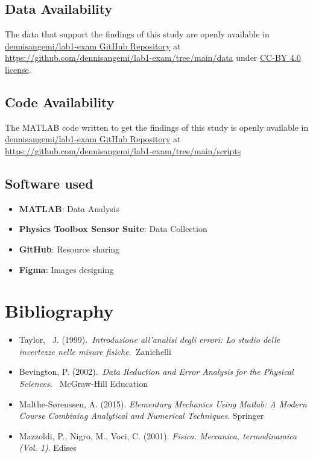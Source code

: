 \documentclass[11pt,a4paper]{article}
\begin{document}
\subsection{Data Availability}
The data that support the findings of this study are openly available in \href{https://github.com/dennisangemi/lab1-exam/tree/main/data}{dennisangemi/lab1-exam GitHub Repository} at \href{https://github.com/dennisangemi/lab1-exam}{https://github.com/dennisangemi/lab1-exam/tree/main/data} under \href{https://creativecommons.org/licenses/by/4.0/}{CC-BY 4.0 license}.

\subsection{Code Availability}
The MATLAB code written to get the findings of this study is openly available in \href{https://github.com/dennisangemi/lab1-exam/tree/main/scripts}{dennisangemi/lab1-exam GitHub Repository} at \href{https://github.com/dennisangemi/lab1-exam/tree/main/scripts}{https://github.com/dennisangemi/lab1-exam/tree/main/scripts}


\subsection{Software used}
\begin{itemize}
    \item \textbf{MATLAB}: Data Analysis
    \item \textbf{Physics Toolbox Sensor Suite}: Data Collection
    \item \textbf{GitHub}: Resource sharing
    \item \textbf{Figma}: Images designing
\end{itemize}

\section{Bibliography}
\begin{itemize}
    \item Taylor,~ J. (1999).~\emph{Introduzione all'analisi degli errori: Lo
  studio delle incertezze nelle misure fisiche.~}Zanichelli
    \item Bevington, P. (2002).~\emph{Data Reduction and Error Analysis for the Physical Sciences.~} McGraw-Hill Education ~
    \item Malthe-Sørenssen, A. (2015). \emph{Elementary Mechanics Using Matlab: A Modern Course Combining Analytical and Numerical Techniques}. Springer
    \item Mazzoldi, P., Nigro, M., Voci, C. (2001). \emph{Fisica. Meccanica, termodinamica (Vol. 1)}. Edises
\end{itemize}
\end{document}
